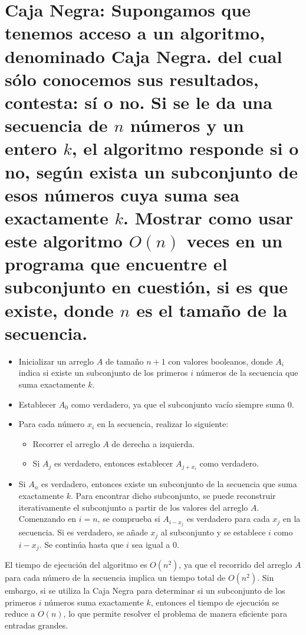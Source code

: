 \section{Caja Negra: Supongamos que tenemos acceso a un algoritmo, denominado Caja Negra. del cual sólo conocemos sus resultados, contesta: sí o no.
Si se le da una secuencia de $n$ números y un entero $k$,  el algoritmo responde si o no, según exista un subconjunto de esos números cuya suma sea exactamente $k$.
Mostrar como usar este algoritmo $O(n)$ veces en un programa que encuentre el subconjunto en cuestión, si es que existe, donde $n$ es el tamaño de la secuencia.}

\begin{itemize}
  \item Inicializar un arreglo $A$ de tamaño $n+1$ con valores booleanos, donde $A_i$ indica si existe un subconjunto de los primeros $i$ números de la secuencia que suma exactamente $k$.
  \item Establecer $A_0$ como verdadero, ya que el subconjunto vacío siempre suma $0$.
  \item Para cada número $x_i$ en la secuencia, realizar lo siguiente:
  \begin{itemize}
    \item Recorrer el arreglo $A$ de derecha a izquierda.
    \item Si $A_j$ es verdadero, entonces establecer $A_{j+x_i}$ como verdadero.
  \end{itemize}
  \item Si $A_n$ es verdadero, entonces existe un subconjunto de la secuencia que suma exactamente $k$. Para encontrar dicho subconjunto, 
  se puede reconstruir iterativamente el subconjunto a partir de los valores del arreglo $A$. Comenzando en $i=n$, se comprueba si $A_{i-x_j}$ 
  es verdadero para cada $x_j$ en la secuencia. Si es verdadero, se añade $x_j$ al subconjunto y se establece $i$ 
  como $i-x_j$. Se continúa hasta que $i$ sea igual a $0$.
\end{itemize}

El tiempo de ejecución del algoritmo es $O(n^2)$, ya que el recorrido del arreglo $A$ 
para cada número de la secuencia implica un tiempo total de $O(n^2)$. Sin embargo, 
si se utiliza la Caja Negra para determinar si un subconjunto de los primeros $i$ números suma exactamente $k$, 
entonces el tiempo de ejecución se reduce a $O(n)$, lo que permite resolver el problema de manera eficiente para entradas grandes.
